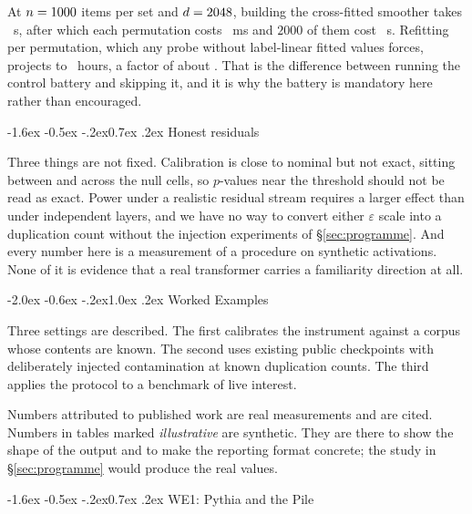 \documentclass[10pt,twocolumn,letterpaper]{article}
\makeatletter
\renewcommand\section{\@startsection{section}{1}{\z@}%
  {-2.0ex \@plus -0.6ex \@minus -.2ex}{1.0ex \@plus .2ex}%
  {\normalfont\large\bfseries}}
\renewcommand\subsection{\@startsection{subsection}{2}{\z@}%
  {-1.6ex \@plus -0.5ex \@minus -.2ex}{0.7ex \@plus .2ex}%
  {\normalfont\normalsize\bfseries}}
\makeatother
\begin{document}
At $n=1000$ items per set and $d=2048$, building the cross-fitted smoother
takes \TimeSetup~s, after which each permutation costs \TimePerPerm~ms and
$2000$ of them cost \TimeB~s. Refitting per permutation, which any probe
without label-linear fitted values forces, projects to \TimeRefitH~hours, a
factor of about \TimeSpeedup. That is the difference between running the
control battery and skipping it, and it is why the battery is mandatory here
rather than encouraged.

\subsection{Honest residuals}

Three things are not fixed. Calibration is close to nominal but not exact,
sitting between \SlopeAAdjZero{} and \SlopeBAdjZero{} across the null cells,
so $p$-values near the threshold should not be read as exact. Power under a
realistic residual stream requires a larger effect than under independent
layers, and we have no way to convert either $\varepsilon$ scale into a
duplication count without the injection experiments of \S\ref{sec:programme}.
And every number here is a measurement of a procedure on synthetic
activations. None of it is evidence that a real transformer carries a
familiarity direction at all.

\section{Worked Examples}
\label{sec:worked}

Three settings are described. The first calibrates the instrument against a corpus whose contents are known. The second uses existing public checkpoints with deliberately injected contamination at known duplication counts. The third applies the protocol to a benchmark of live interest.

Numbers attributed to published work are real measurements and are cited. Numbers in tables marked \emph{illustrative} are synthetic. They are there to show the shape of the output and to make the reporting format concrete; the study in \S\ref{sec:programme} would produce the real values.

\subsection{WE1: Pythia and the Pile}
\label{sec:we1}
\end{document}
